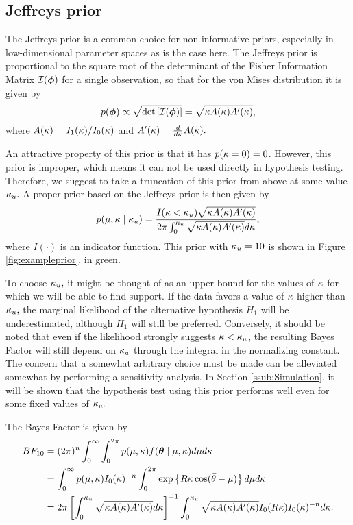 \subsection{Jeffreys prior}
\label{sub:jeffprior}

The Jeffreys prior is a common choice for non-informative priors, especially in low-dimensional parameter spaces as is the case here. The Jeffreys prior is proportional to the square root of the determinant of the Fisher Information Matrix \( \mathcal{I}(\boldsymbol{\phi}) \) for a single observation, so that for the von Mises distribution it is given by
\begin{equation}
  p(\boldsymbol{\phi}) \propto \sqrt{ \text{det}\left[ \mathcal{I}(\boldsymbol{\phi}) \right] } = \sqrt{\kappa A(\kappa) A'(\kappa) },
\end{equation}
where \( A(\kappa) = I_1(\kappa) / I_0(\kappa) \) and \( A'(\kappa) = \frac{d}{d \kappa} A(\kappa).\)

An attractive property of this prior is that it has \( p(\kappa = 0) = 0 \). However, this prior is improper, which means it can not be used directly in hypothesis testing. Therefore, we suggest to take a truncation of this prior from above at some value \( \kappa_u. \) A proper prior based on the Jeffreys prior is then given by
\begin{equation}
  p(\mu, \kappa \mid \kappa_u) = \frac{I(\kappa < \kappa_u) \sqrt{\kappa A(\kappa) A'(\kappa) } }{2 \pi \int_0^{\kappa_u} \sqrt{\kappa A(\kappa) A'(\kappa)}  d\kappa },
\end{equation}
where \( I(\cdot) \) is an indicator function. This prior with \( \kappa_u = 10 \) is shown in Figure \ref{fig:exampleprior}, in green.

To choose \( \kappa_u, \) it might be thought of as an upper bound for the values of \( \kappa \) for which we will be able to find support. If the data favors a value of \( \kappa \) higher than \( \kappa_u, \) the marginal likelihood of the alternative hypothesis \( H_1 \) will be underestimated, although \( H_1 \) will still be preferred. Conversely, it should be noted that even if the likelihood strongly suggests \( \kappa < \kappa_u \), the resulting Bayes Factor will still depend on \( \kappa_u \) through the integral in the normalizing constant. The concern that a somewhat arbitrary choice must be made can be alleviated somewhat by performing a sensitivity analysis. In Section \ref{ssub:Simulation}, it will be shown that the hypothesis test using this prior performs well even for some fixed values of \( \kappa_u.\)

The Bayes Factor is given by
\begin{align}
  BF_{10} &= (2 \pi)^n \int_0^{\infty}  \int_0^{2\pi} p(\mu, \kappa ) f (\boldsymbol{\theta} \mid \mu, \kappa)  d\mu d\kappa \\
  &= \int_0^{\infty}  p(\mu, \kappa) I_0(\kappa)^{-n}    \int_0^{2\pi} \exp \left\{ R \kappa \cos(\bar{\theta} - \mu) \right\}  d\mu d\kappa \\
  &= 2 \pi \left[ \int_0^{\kappa_u} \sqrt{\kappa A(\kappa) A'(\kappa)} d\kappa \right]^{-1}  \int_0^{\kappa_u}  \sqrt{\kappa A(\kappa) A'(\kappa) }  I_0(R \kappa) I_0(\kappa)^{-n} d\kappa.
\end{align}


